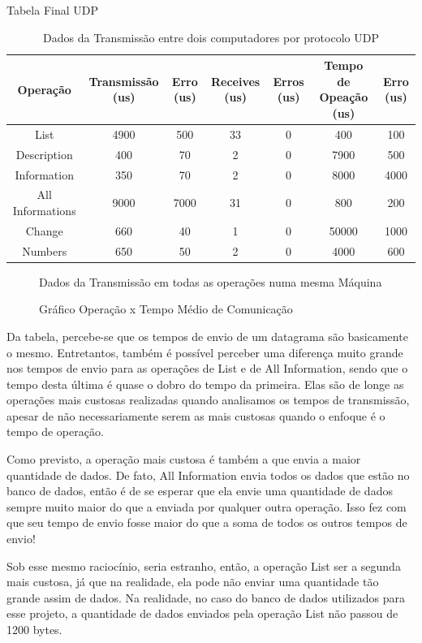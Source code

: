 \documentclass[10pt,a4paper]{report}
\begin{document}
\begin{table}[h]
\caption{Tabela Final UDP}
\begin{tabular}{|c|c|c|c|c|c|c|}
\hline 
Operação & Transmissão (us) & Erro (us) & Receives (us) & Erros (us) & Tempo de Opeação (us) & Erro (us) \\ 
\hline 
List & 4900 & 500 & 33 & 0 & 400 & 100 \\ 
\hline 
Description & 400 & 70 & 2 & 0 & 7900 & 500 \\ 
\hline 
Information & 350 & 70 & 2 & 0 & 8000 & 4000 \\ 
\hline 
All Informations & 9000 & 7000 & 31 & 0 & 800 & 200 \\ 
\hline 
Change & 660 & 40 & 1 & 0 & 50000 & 1000 \\ 
\hline 
Numbers & 650 & 50 & 2 & 0 & 4000 & 600 \\ 
\hline 
\end{tabular} 
\caption{Dados da Transmissão entre dois computadores por protocolo UDP}
\end{table}

\begin{figure}[h!]
\caption{Dados da Transmissão em todas as operações numa mesma Máquina}
\caption{Gráfico Operação x Tempo Médio de Comunicação}
\end{figure}

Da tabela, percebe-se que os tempos de envio de um datagrama são basicamente o mesmo. Entretantos, também é possível perceber uma diferença muito grande nos tempos de envio para as operações de List e de All Information, sendo que o tempo desta última é quase o dobro do tempo da primeira. Elas são de longe as operações mais custosas realizadas quando analisamos os tempos de transmissão, apesar de não necessariamente serem as mais custosas quando o enfoque é o tempo de operação.
	
	Como previsto, a operação mais custosa é também a que envia a maior quantidade de dados. De fato, All Information envia todos os dados que estão no banco de dados, então é de se esperar que ela envie uma quantidade de dados sempre muito maior do que a enviada por qualquer outra operação. Isso fez com que seu tempo de envio fosse maior do que a soma de todos os outros tempos de envio!
	
	Sob esse mesmo raciocínio, seria estranho, então, a operação List ser a segunda mais custosa, já que na realidade, ela pode não enviar uma quantidade tão grande assim de dados. Na realidade, no caso do banco de dados utilizados para esse projeto, a quantidade de dados enviados pela operação List não passou de 1200 bytes.
	
\end{document}
